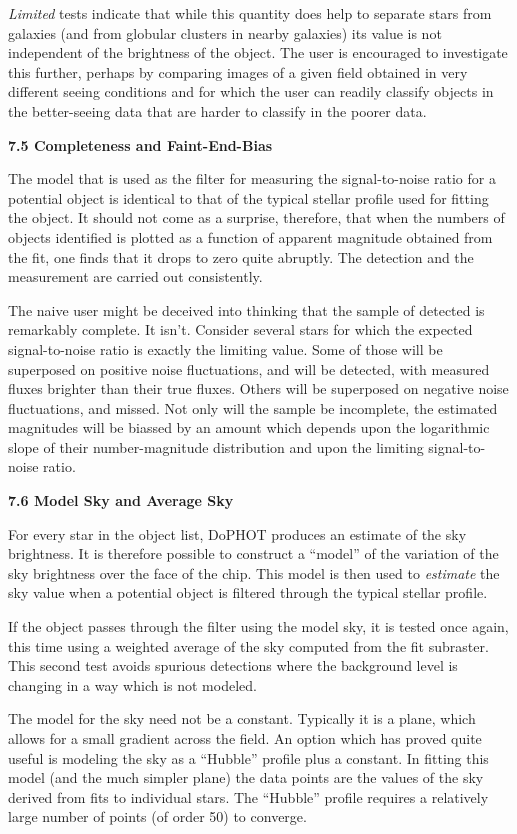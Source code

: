 {\it Limited} tests indicate that while this quantity does
help to separate stars from galaxies (and from globular
clusters in nearby galaxies) its value is not independent
of the brightness of the object.  The user is encouraged
to investigate this further, perhaps by comparing images of a given
field obtained in very different seeing conditions and for which the
user can readily classify objects in the better-seeing data that are
harder to classify in the poorer data.

\centerline{\bf 7.5 Completeness and Faint-End-Bias}

The model that is used as the filter for measuring the
signal-to-noise ratio for a potential object is identical to
that of the typical stellar profile used for fitting the
object.  It should not come as a surprise, therefore, that
when the numbers of objects identified is plotted as a
function of apparent magnitude obtained from the fit, one finds
that it drops to zero quite abruptly.  The detection and the
measurement are carried out consistently.

The naive user might be deceived into thinking that the
sample of detected is remarkably complete.  It isn't.
Consider several stars for which the expected
signal-to-noise ratio is exactly the limiting value.  Some
of those will be superposed on positive noise fluctuations,
and will be detected, with measured fluxes brighter than
their true fluxes.  Others will be superposed on negative
noise fluctuations, and missed.  Not only will the sample be
incomplete, the estimated magnitudes will be biassed by an
amount which depends upon the logarithmic slope of their
number-magnitude distribution and upon the limiting
signal-to-noise ratio.

\centerline{\bf 7.6 Model Sky and Average Sky}

For every star in the object list, DoPHOT produces an
estimate of the sky brightness.  It is therefore
possible to construct a ``model'' of the variation
of the sky brightness over the face of the chip.
This model is then used to {\it estimate} the sky value
when a potential object is filtered through the
typical stellar profile.

If the object passes through the filter using
the model sky, it is tested once again, this time
using a weighted average of the sky computed from
the fit subraster.  This second test avoids spurious
detections where the background level is changing
in a way which is not modeled.

The model for the sky need not be a constant.  Typically
it is a plane, which allows for a small gradient across
the field.  An option which has proved quite useful
is modeling the sky as a ``Hubble'' profile plus a
constant.   In fitting this model (and the much simpler
plane) the data points are the values of the sky derived
from fits to individual stars.  The ``Hubble'' profile
requires a relatively large number of points (of order 50)
to converge.

